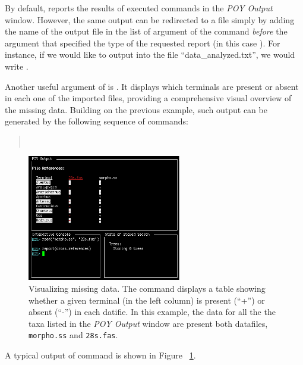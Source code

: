 By default, \poy reports the results of executed commands in the \emph{POY Output} window. However, the same output can be redirected to a file simply by adding the name of the output file in the list of argument of the command  \emph{before} the argument that specified the type of the requested report (in this case ). For instance, if we would like to output into the file ``data\_analyzed.txt'', we would write .

Another useful argument of  is . It displays which terminals are present or absent in each one of the imported files, providing a comprehensive visual overview of the missing data. Building on the previous example, such output can be generated by the following sequence of commands:
\begin{quote}
    \\
\end{quote}

\begin{figure}[]
    \begin{center}
        \includegraphics[width=0.6\textwidth]{figures/crossref.jpg}
    \end{center}
    \caption{Visualizing missing data. The command  displays a table showing whether a given terminal (in the left column) is present (``+'') or absent (``-'') in each datifie. In this example, the data for all the the taxa listed in the \emph{POY Output} window are present both datafiles, \texttt{morpho.ss} and \texttt{28s.fas}.}
    \label{fig:crossref}
\end{figure}

A typical output of  command is shown in Figure ~\ref{fig:crossref}.

